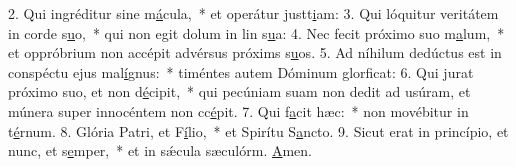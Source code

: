 2. Qui ingréditur sine m\uline{á}cula,~* et operátur justt\uline{i}am:
3. Qui lóquitur veritátem in corde s\uline{u}o,~* qui non egit dolum in lin s\uline{u}a:
4. Nec fecit próximo suo m\uline{a}lum,~* et oppróbrium non accépit advérsus próxims s\uline{u}os.
5. Ad níhilum dedúctus est in conspéctu ejus mal\uline{í}gnus:~* timéntes autem Dóminum glorf\uline{i}cat:
6. Qui jurat próximo suo, et non d\uline{é}cipit,~* qui pecúniam suam non dedit ad usúram, et múnera super innocéntem non cc\uline{é}pit.
7. Qui f\uline{a}cit hæc:~* non movébitur in t\uline{é}rnum.
8. Glória Patri, et F\uline{í}lio,~* et Spirítu S\uline{a}ncto.
9. Sicut erat in princípio, et nunc, et s\uline{e}mper,~* et in sǽcula sæculórm. \uline{A}men.
